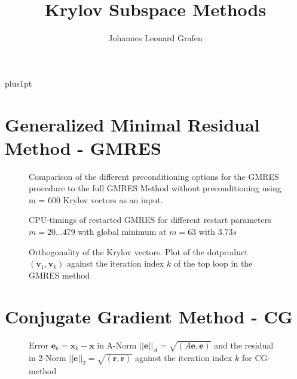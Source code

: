 \documentclass[11pt,a4paper]{article}
\title{Krylov Subspace Methods}
\author{Johannes Leonard Grafen}
\begin{document}
\renewcommand\baselinestretch{1.0}
\baselineskip=18pt plus1pt	
	
\maketitle
\tableofcontents
\listoffigures	%
\listoftables  %

\section{Generalized Minimal Residual Method - GMRES}
\label{chapter:GMRES}

\begin{figure}[!htbp]
	\hspace*{0.8cm}
	\leavevmode
	\resizebox{1.0\width}{!}{}
	\caption{Comparison of the different preconditioning options for the GMRES procedure to the full GMRES Method without preconditioning using m = 600 Krylov vectors as an input.}
	\label{fig::Residuals}
\end{figure}

\begin{figure}[!htbp]
	\hspace*{0.8cm}
	\leavevmode
	\resizebox{1.0\width}{!}{}
	\caption{CPU-timings of restarted GMRES for different restart parameters $m = {20...479} $ with global minimum at $m = 63$ with $3.73 s$}
	\label{fig::Timings}
\end{figure}

\begin{figure}[!htbp]
	\hspace*{0.8cm}
	\leavevmode
	\resizebox{1.0\width}{!}{}
	\caption{Orthogonality of the Krylov vectors. Plot of the dotproduct $(\mathbf{v}_1, \mathbf{v}_k)$ against the iteration index $k$ of the top loop in the GMRES method}
	\label{fig::DotP}
\end{figure}



\section{Conjugate Gradient Method - CG}
\label{chapter:CG}

\begin{figure}[!htbp]
	\hspace*{0.8cm}
	\leavevmode
	\resizebox{1.0\width}{!}{}
	\caption{Error $\mathbf{e}_k = \mathbf{x}_k - \mathbf{x} $ in A-Norm $||\mathbf{e}||_A = \sqrt{(A\mathbf{e}, \mathbf{e})}$ and the residual in 2-Norm $||\mathbf{e}||_2 = \sqrt{(\mathbf{r}, \mathbf{r})}$ against the iteration index $k$ for CG-method}
	\label{fig::CGNorms}
\end{figure}
\end{document}
